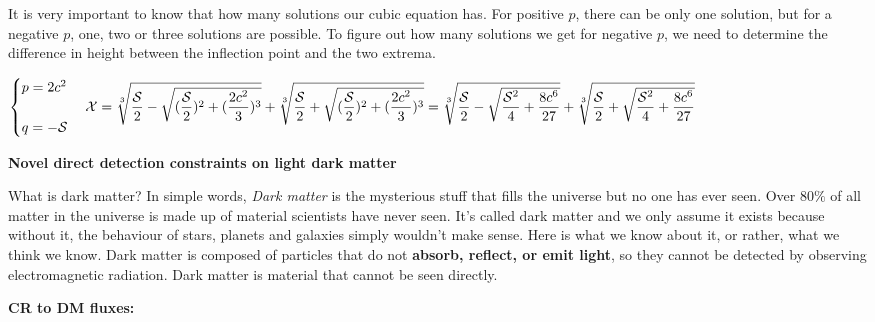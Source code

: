 \documentclass[fleqn]{article}
\begin{document}
It is very important to know that how many solutions our cubic equation has. For positive $p$, 
there can be only one solution, but for a negative $p$, one, two or three solutions are possible. 
To figure out how many solutions we get for negative $p$, we need to determine the difference in height 
between the inflection point and the two extrema.

$
  \begin{cases}
    p=2c^2
    \\
    \\
    q=-\mathcal{S}
  \end{cases}
  \\
  \\
  \\
  \mathcal{X}=\sqrt[3]{\dfrac{\mathcal{S}}{2}-\sqrt{(\dfrac{\mathcal{S}}{2})^2+(\dfrac{2c^2}{3})^3}}
  +\sqrt[3]{\dfrac{\mathcal{S}}{2}+\sqrt{(\dfrac{\mathcal{S}}{2})^2+(\dfrac{2c^2}{3})^3}}
  \\
  \\
  \\
  =\sqrt[3]{\dfrac{\mathcal{S}}{2}-\sqrt{\dfrac{\mathcal{S}^2}{4}+\dfrac{8c^6}{27}}}
  +\sqrt[3]{\dfrac{\mathcal{S}}{2}+\sqrt{\dfrac{\mathcal{S}^2}{4}+\dfrac{8c^6}{27}}}
  \\
  \\
  \\
$

\pagebreak

\textbf{Novel direct detection constraints on light dark matter}

\vspace{10px}

What is dark matter? In simple words, \emph{Dark matter} is the mysterious stuff that fills the universe 
but no one has ever seen. Over $80\%$ of all matter in the universe is made up of material scientists 
have never seen. It's called dark matter and we only assume it exists because without it, the behaviour 
of stars, planets and galaxies simply wouldn't make sense. Here is what we know about it, or rather, 
what we think we know. Dark matter is composed of particles that do not \textbf{absorb, reflect, or emit light}, 
so they cannot be detected by observing electromagnetic radiation. Dark matter is material that cannot 
be seen directly.

\vspace{20px}

\textbf{ CR to DM fluxes:}

\vspace{10px}
\end{document}
